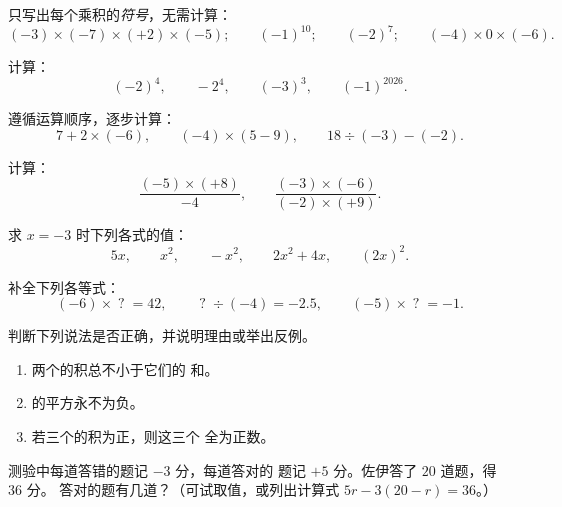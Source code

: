 \begin{exercise}[$\star$]\label{exo:g8:negprod:3}
只写出每个乘积的\emph{符号}，无需计算：
\[
(-3) \times (-7) \times (+2) \times (-5); \qquad
(-1)^{10}; \qquad
(-2)^{7}; \qquad
(-4) \times 0 \times (-6).
\]
\end{exercise}

\begin{exercise}[$\star$]\label{exo:g8:negprod:4}
计算：
\[
(-2)^4, \qquad
-2^4, \qquad
(-3)^3, \qquad
(-1)^{2026} .
\]
\end{exercise}

\begin{exercise}[$\star$]\label{exo:g8:negprod:5}
遵循运算顺序，逐步计算：
\[
7 + 2 \times (-6), \qquad
(-4) \times (5 - 9), \qquad
18 \div (-3) - (-2) .
\]
\end{exercise}

\begin{exercise}[$\star$]\label{exo:g8:negprod:6}
计算：
\[
\frac{(-5) \times (+8)}{-4}, \qquad
\frac{(-3) \times (-6)}{(-2) \times (+9)} .
\]
\end{exercise}

\begin{exercise}[$\star$]\label{exo:g8:negprod:7}
求 $x = -3$ 时下列各式的值：
\[
5x, \qquad x^2, \qquad -x^2, \qquad 2x^2 + 4x, \qquad (2x)^2 .
\]
\end{exercise}

\begin{exercise}[$\star\star$]\label{exo:g8:negprod:8}
补全下列各等式：
\[
(-6) \times \;?\; = 42, \qquad
\;?\; \div (-4) = -2.5, \qquad
(-5) \times \;?\; = -1 .
\]
\end{exercise}

\begin{exercise}[$\star\star$]\label{exo:g8:negprod:9}
判断下列说法是否正确，并说明理由或举出反例。
\begin{enumerate}
  \item 两个的积总不小于它们的
        和。
  \item {}的平方永不为负。
  \item 若三个的积为正，则这三个
        全为正数。
\end{enumerate}
\end{exercise}

\begin{exercise}[$\star\star$]\label{exo:g8:negprod:10}
测验中每道答错的题记 $-3$ 分，每道答对的
题记 $+5$ 分。佐伊答了 $20$ 道题，得 $36$ 分。
答对的题有几道？（可试取值，或列出计算式
$5r - 3(20 - r) = 36$。）
\end{exercise}

